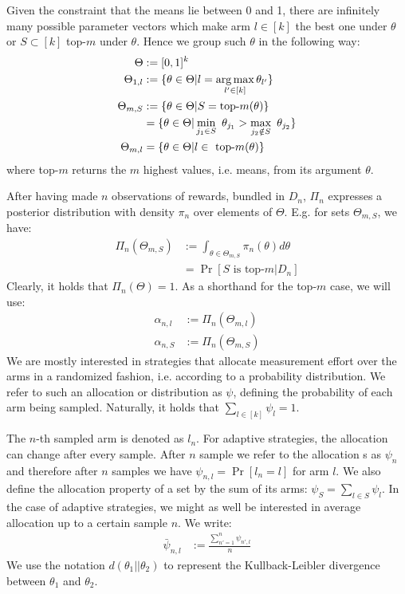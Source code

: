Given the constraint that the means lie between 0 and 1, there are infinitely many possible parameter vectors which make arm $l \in [k]$ the best one under $\theta$ or $S \subset [k]$ top-$m$ under $\theta$. Hence we group such $\theta$ in the following way:
\begin{align}
  \Theta &:= [0, 1]^k \\
  \Theta_{1, l} &:= \{\theta \in \Theta | l = \operatorname*{arg\,max}_{l' \in [k]} \theta_{l'}\} \\
  \Theta_{m, S} &:= \{\theta \in \Theta | S = \text{top-}m(\theta)\} \\
    &= \{ \theta \in \Theta| \min_{j_1 \in S}\ \theta_{j_1} > \max_{j_2 \notin S}\ \theta_{j_2}\} \\
  \Theta_{m, l} &= \{\theta \in \Theta | l \in \text{ top-}m(\theta)\}
\end{align}
where top-$m$ returns the $m$ highest values, i.e. means, from its argument $\theta$.

After having made $n$ observations of rewards, bundled in $D_n$, $\Pi_n$ expresses a posterior distribution with density $\pi_n$ over elements of $\Theta$. E.g. for sets $\Theta_{m, S}$, we have:
\begin{align}
  \Pi_n(\Theta_{m, S}) &:= \int_{\theta \in \Theta_{m, S}} \pi_n(\theta) d\theta \\
    &= \Pr[S \text{ is top-}m | D_n]
\end{align}
Clearly, it holds that $\Pi_n(\Theta) = 1$. As a shorthand for the top-$m$ case, we will use:
\begin{align}
  \alpha_{n, l} &:= \Pi_n(\Theta_{m, l}) \\
  \alpha_{n, S} &:= \Pi_n(\Theta_{m, S})
\end{align}
We are mostly interested in strategies that allocate measurement effort over the arms in a randomized fashion, i.e. according to a probability distribution. We refer to such an allocation or distribution as $\psi$, defining the probability of each arm being sampled. Naturally, it holds that $\sum_{l \in [k]} \psi_l = 1$.

The $n$-th sampled arm is denoted as $l_n$. For adaptive strategies, the allocation can change after every sample. After $n$ sample we refer to the allocation s as $\psi_{n}$ and therefore after $n$ samples we have $\psi_{n, l} = \Pr[l_n = l]$ for arm $l$. We also define the allocation property of a set by the sum of its arms: $\psi_S = \sum_{l \in S} \psi_l$. In the case of adaptive strategies, we might as well be interested in average allocation up to a certain sample $n$. We write:
\begin{align}
  \bar{\psi}_{n, l} &:= \frac{\sum_{n' = 1}^{n} \psi_{n', l}}{n}
\end{align}
We use the notation $d(\theta_1||\theta_2)$ to represent the Kullback-Leibler divergence between $\theta_1$ and $\theta_2$.

